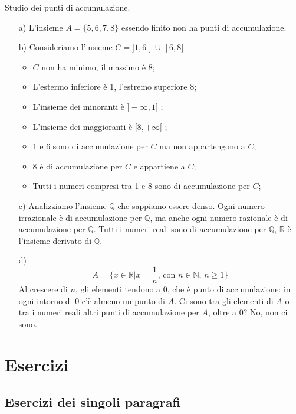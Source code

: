 \begin{esempio}
Studio dei punti di accumulazione.
\begin{itemize}
  \item[a)] L'insieme $A=\{ 5,6,7,8\}$ essendo finito non ha punti di 
accumulazione.
  \item[b)] Consideriamo l'insieme $C=]1,6[\,\cup\,]6,8]$
  \begin{itemize}
  \item $C$ non ha minimo, il massimo è 8;
  \item L'estermo inferiore è 1, l'estremo superiore 8;
  \item L'insieme dei minoranti è $]-\infty,1]$ ;
  \item L'insieme dei maggioranti è $[8,+\infty[$ ;
  \item 1 e 6 sono di accumulazione per $C$ ma non 
appartengono a $C$;
  \item 8 è di accumulazione per $C$ e appartiene a $C$;
  \item Tutti i numeri compresi tra 1 e 8 sono di 
accumulazione per $C$;
  \end{itemize}
  \item[c)] Analizziamo l'insieme $\mathbb{Q}$ che sappiamo essere 
denso. Ogni numero irrazionale è di accumulazione per $\mathbb{Q}$, ma anche 
ogni numero razionale è di accumulazione per $\mathbb{Q}$. Tutti i numeri 
reali sono di accumulazione per $\mathbb{Q}$, $\mathbb{R}$ è l'insieme 
derivato di $\mathbb{Q}$.\\
  \item[d)] $$A=\biggl\{ x\in\mathbb{R} \vert x=\frac{1}{n}, 
\,\text{con}\,\, n\in\mathbb{N},\,n\geq1 \biggr\}$$
Al crescere di $n$, gli elementi tendono a 0, che è punto di accumulazione: 
in ogni intorno di 0 c'è almeno un punto di $A$. Ci sono tra gli elementi di 
$A$ o tra i numeri reali altri punti di accumulazione per $A$, oltre a 0? No, 
non ci sono.\\
\end{itemize}
\end{esempio}
\newpage
\section{Esercizi}
  \subsection{Esercizi dei singoli paragrafi}
